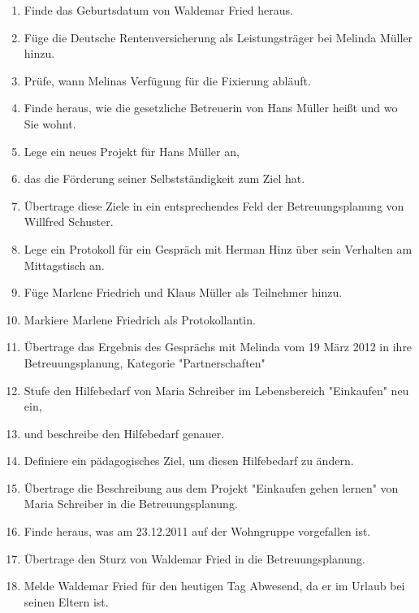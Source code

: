 \begin{description}
        \begin{enumerate}
		\item Finde das Geburtsdatum von Waldemar Fried heraus. 
		\item Füge die Deutsche Rentenversicherung als Leistungsträger bei Melinda Müller hinzu.
		\item Prüfe, wann Melinas Verfügung für die Fixierung abläuft.
		\item Finde heraus, wie die gesetzliche Betreuerin von Hans Müller heißt und wo Sie wohnt.
		\item Lege ein neues Projekt für Hans Müller an, 
		\item das die Förderung seiner Selbstständigkeit zum Ziel hat.
		\item Übertrage diese Ziele in ein entsprechendes Feld der Betreuungsplanung von Willfred Schuster.
		\item Lege ein Protokoll für ein Gespräch mit Herman Hinz über sein Verhalten am Mittagstisch an.
		\item Füge Marlene Friedrich und Klaus Müller als Teilnehmer hinzu.
		\item Markiere Marlene Friedrich als Protokollantin.
		\item Übertrage das Ergebnis des Gesprächs mit Melinda vom 19 März 2012 in ihre Betreuungsplanung, Kategorie "Partnerschaften"
		\item Stufe den Hilfebedarf von Maria Schreiber im Lebensbereich "Einkaufen" neu ein,
		\item und beschreibe den Hilfebedarf genauer.
		\item Definiere ein pädagogisches Ziel, um diesen Hilfebedarf zu ändern.
		\item Übertrage die Beschreibung aus dem Projekt "Einkaufen gehen lernen" von Maria Schreiber in die Betreuungsplanung.
		\item Finde heraus, was am 23.12.2011 auf der Wohngruppe vorgefallen ist.
		\item Übertrage den Sturz von Waldemar Fried in die Betreuungsplanung.
		\item Melde Waldemar Fried für den heutigen Tag Abwesend, da er im Urlaub bei seinen Eltern ist.
        \end{enumerate}

\end{description}

